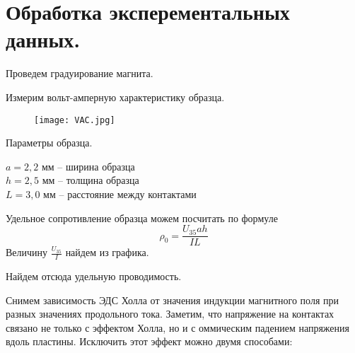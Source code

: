 


    

    \section*{Обработка эксперементальных данных.}

    \noindent Проведем градуирование магнита.
    

    \noindent Измерим вольт-амперную характеристику образца.
    
    
    \begin{figure}[h!]
        \centering
        \texttt{[image: VAC.jpg]}
        \caption{}
    \end{figure}

    \noindent Параметры образца.
    \begin{center}
        $a = 2,2$ мм -- ширина образца              \\
        $h = 2,5$ мм -- толщина образца             \\
        $L = 3,0$ мм -- расстояние между контактами \\
    \end{center}

    \noindent Удельное сопротивление образца можем посчитать по формуле
    \begin{equation*}
        \rho_0 = \frac{U_{35} a h}{I L}
    \end{equation*}
    \noindent Величину $\frac{U_{35}}{I}$ найдем из графика.

    \begin{center}
    \end{center}

    \noindent Найдем отсюда удельную проводимость.

    \begin{center}
    \end{center}

    \noindent Снимем зависимость ЭДС Холла от значения индукции магнитного поля при разных значениях продольного тока.
    Заметим, что напряжение на контактах связано не только с эффектом Холла, но и с 
    оммическим падением напряжения вдоль пластины. Исключить этот эффект можно двумя способами:


